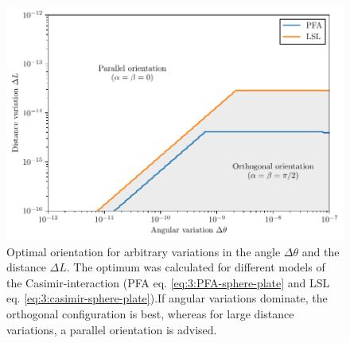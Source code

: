 \begin{figure}[!htbp]
  \centering
  \includegraphics[width=\textwidth]{./../figures/optimize/optimized-orientation.pdf}
  \caption{Optimal orientation for arbitrary variations in the angle $\Delta\theta$ and the distance $\Delta L$. The optimum was calculated for different models of the Casimir-interaction (PFA eq. \eqref{eq:3:PFA-sphere-plate} and LSL eq. \eqref{eq:3:casimir-sphere-plate}).If angular variations dominate, the orthogonal configuration is best, whereas for large distance variations, a parallel orientation is advised.}
  \label{fig:4:optimal-orientation}
\end{figure}
